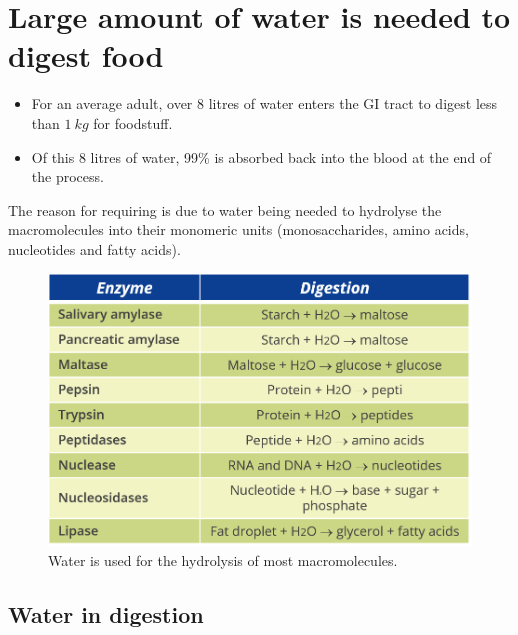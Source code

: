 \documentclass[11pt]{article}
\begin{document}
\newpage

\section{Large amount of water is needed to digest food}
\label{sec:orgd9931a2}
\begin{itemize}
\item For an average adult, over 8 litres of water enters the GI tract to digest less than \(\qty{1}{\unit{kg}}\) for foodstuff.
\item Of this 8 litres of water, 99\% is absorbed back into the blood at the end of the process.
\end{itemize}

The reason for requiring is due to water being needed to hydrolyse the macromolecules into their monomeric units (monosaccharides, amino acids, nucleotides and fatty acids).

\begin{figure}[htbp]
\centering
\includegraphics[width=.9\linewidth]{./images/hydrolysis-table.png}
\caption{Water is used for the hydrolysis of most macromolecules.}
\end{figure}

\newpage

\subsection{Water in digestion}
\label{sec:org5254efc}
\end{document}
